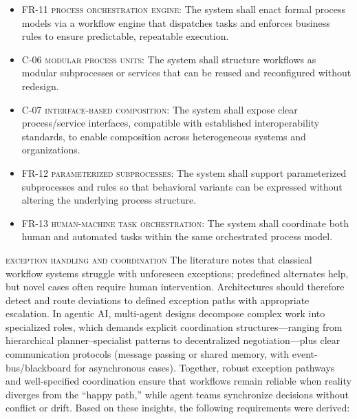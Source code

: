 \begin{itemize}
  \item \textsc{FR-11 process orchestration engine}: The system shall enact formal process models via a workflow engine that dispatches tasks and enforces business rules to ensure predictable, repeatable execution.
  \item \textsc{C-06 modular process units}: The system shall structure workflows as modular subprocesses or services that can be reused and reconfigured without redesign.
  \item \textsc{C-07 interface-based composition}: The system shall expose clear process/service interfaces, compatible with established interoperability standards, to enable composition across heterogeneous systems and organizations.
  \item \textsc{FR-12 parameterized subprocesses}: The system shall support parameterized subprocesses and rules so that behavioral variants can be expressed without altering the underlying process structure.
  \item \textsc{FR-13 human-machine task orchestration}: The system shall coordinate both human and automated tasks within the same orchestrated process model.
\end{itemize}

\noindent \textsc{exception handling and coordination} \quad The literature notes that classical workflow systems struggle with unforeseen exceptions; predefined alternates help, but novel cases often require human intervention. Architectures should therefore detect and route deviations to defined exception paths with appropriate escalation. In agentic AI, multi-agent designs decompose complex work into specialized roles, which demands explicit coordination structures—ranging from hierarchical planner–specialist patterns to decentralized negotiation—plus clear communication protocols (message passing or shared memory, with event-bus/blackboard for asynchronous cases). Together, robust exception pathways and well-specified coordination ensure that workflows remain reliable when reality diverges from the “happy path,” while agent teams synchronize decisions without conflict or drift. Based on these insights, the following requirements were derived:

